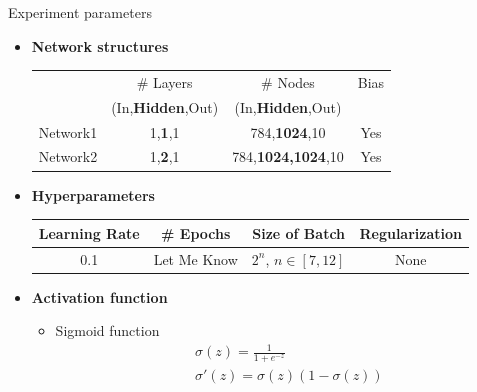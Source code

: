 \begin{frame}{Experiment parameters}
  \begin{itemize}
       \item{ \textbf{Network structures} }
				\begin{center}
				  \begin{tabular}{ | l | c | c | c | }
				    \hline
				      & \cellcolor[gray]{0.85} \# Layers & \cellcolor[gray]{0.85} \# Nodes & \cellcolor[gray]{0.85} Bias \\
				      & \cellcolor[gray]{0.85} (In,\textbf{Hidden},Out) & \cellcolor[gray]{0.85} (In,\textbf{Hidden},Out) &\cellcolor[gray]{0.85}  \\ \hline
				    Network1 & 1,\textbf{1},1 & 784,\textbf{1024},10 & Yes \\ \hline 
				    Network2 & 1,\textbf{2},1 & 784,\textbf{1024,1024},10 & Yes \\
				    \hline
				  \end{tabular}
				\end{center}
				
    \item{ \textbf{Hyperparameters} }
    \begin{center}
				  \begin{tabular}{ | c | c | c | c | }
				    \hline
				      \cellcolor[gray]{0.85} Learning Rate & \cellcolor[gray]{0.85} \# Epochs & \cellcolor[gray]{0.85} Size of Batch & \cellcolor[gray]{0.85} Regularization \\ \hline
				      0.1 & Let Me Know & $2^n$, $n\in[7,12]$ & None \\
				    \hline
				  \end{tabular}
				\end{center}
     \item{ \textbf{Activation function}}
     \begin{itemize}
      		\item{Sigmoid function}
      		\begin{align*}
      		& \sigma(z)=\frac{1}{1+e^{-z}}\\
      		& \sigma'(z)=\sigma(z)(1-\sigma(z))
      		\end{align*}
    \end{itemize}
  \end{itemize}
\end{frame}

